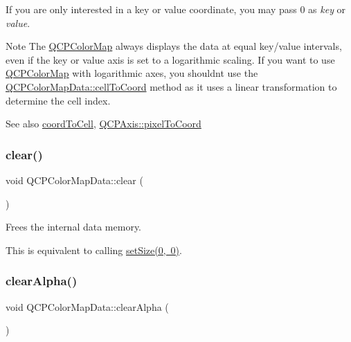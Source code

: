 If you are only interested in a key or value coordinate, you may pass 0 as {\itshape key} or {\itshape value}.

\begin{DoxyNote}{Note}
The \mbox{\hyperlink{class_q_c_p_color_map}{Q\+C\+P\+Color\+Map}} always displays the data at equal key/value intervals, even if the key or value axis is set to a logarithmic scaling. If you want to use \mbox{\hyperlink{class_q_c_p_color_map}{Q\+C\+P\+Color\+Map}} with logarithmic axes, you shouldn\textquotesingle{}t use the \mbox{\hyperlink{class_q_c_p_color_map_data_af1a36385c78ab624cd617065602408b6}{Q\+C\+P\+Color\+Map\+Data\+::cell\+To\+Coord}} method as it uses a linear transformation to determine the cell index.
\end{DoxyNote}
\begin{DoxySeeAlso}{See also}
\mbox{\hyperlink{class_q_c_p_color_map_data_aca5b29e0ca2f299c9060fc6e1f74d0c8}{coord\+To\+Cell}}, \mbox{\hyperlink{class_q_c_p_axis_a536ef8f624cac59b6b6fdcb495723c57}{Q\+C\+P\+Axis\+::pixel\+To\+Coord}} 
\end{DoxySeeAlso}
\mbox{\label{class_q_c_p_color_map_data_a9910ba830e96955bd5c8e5bef1e77ef3}} 
\subsubsection{\texorpdfstring{clear()}{clear()}}
{\footnotesize\ttfamily void Q\+C\+P\+Color\+Map\+Data\+::clear (\begin{DoxyParamCaption}{ }\end{DoxyParamCaption})}

Frees the internal data memory.

This is equivalent to calling \mbox{\hyperlink{class_q_c_p_color_map_data_a0d9ff35c299d0478b682bfbcdd9c097e}{set\+Size(0, 0)}}. \mbox{\label{class_q_c_p_color_map_data_a14d08b9c3720cd719400079b86d3906b}} 
\subsubsection{\texorpdfstring{clear\+Alpha()}{clearAlpha()}}
{\footnotesize\ttfamily void Q\+C\+P\+Color\+Map\+Data\+::clear\+Alpha (\begin{DoxyParamCaption}{ }\end{DoxyParamCaption})}

